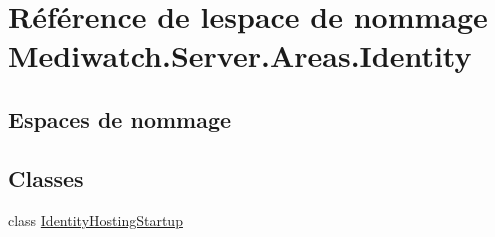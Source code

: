 \hypertarget{namespace_mediwatch_1_1_server_1_1_areas_1_1_identity}{}\section{Référence de l\textquotesingle{}espace de nommage Mediwatch.\+Server.\+Areas.\+Identity}
\label{namespace_mediwatch_1_1_server_1_1_areas_1_1_identity}
\subsection*{Espaces de nommage}
\begin{DoxyCompactItemize}
\end{DoxyCompactItemize}
\subsection*{Classes}
\begin{DoxyCompactItemize}
\item 
class \hyperlink{class_mediwatch_1_1_server_1_1_areas_1_1_identity_1_1_identity_hosting_startup}{Identity\+Hosting\+Startup}
\end{DoxyCompactItemize}
